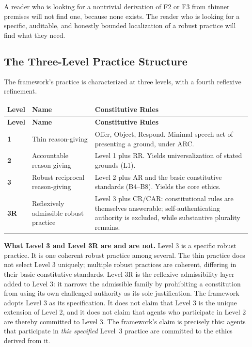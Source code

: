 \documentclass[11pt]{article}
\begin{document}
A reader who is looking for a nontrivial derivation of F2 or F3 from thinner premises will not find one, because none exists. The reader who is looking for a specific, auditable, and honestly bounded localization of a robust practice will find what they need.

\subsection{The Three-Level Practice Structure}
The framework's practice is characterized at three levels, with a fourth reflexive refinement.
\begin{longtable}{@{}L{1.3cm} L{4.2cm} L{9.4cm}@{}}
\toprule
\textbf{Level} & \textbf{Name} & \textbf{Constitutive Rules} \\
\midrule
\endfirsthead
\toprule
\textbf{Level} & \textbf{Name} & \textbf{Constitutive Rules} \\
\midrule
\endhead
\bottomrule
\endfoot
\textbf{1} & Thin reason-giving & Offer, Object, Respond. Minimal speech act of presenting a ground, under ARC. \\
\textbf{2} & Accountable reason-giving & Level 1 plus RR. Yields universalization of stated grounds (L1). \\
\textbf{3} & Robust reciprocal reason-giving & Level 2 plus AR and the basic constitutive standards (B4--B8). Yields the core ethics. \\
\textbf{3R} & Reflexively admissible robust practice & Level 3 plus CR/CAR: constitutional rules are themselves answerable; self-authenticating authority is excluded, while substantive plurality remains. \\
\end{longtable}

\textbf{What Level 3 and Level 3R are and are not.} Level 3 is a specific robust practice. It is one coherent robust practice among several. The thin practice does not select Level 3 uniquely; multiple robust practices are coherent, differing in their basic constitutive standards. Level 3R is the reflexive admissibility layer added to Level 3: it narrows the admissible family by prohibiting a constitution from using its own challenged authority as its sole justification. The framework adopts Level 3 as its specification. It does not claim that Level 3 is the unique extension of Level 2, and it does not claim that agents who participate in Level 2 are thereby committed to Level 3. The framework's claim is precisely this: agents that participate in \emph{this specified} Level~3 practice are committed to the ethics derived from it.
\end{document}
